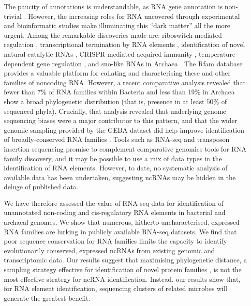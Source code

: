 \documentclass[10pt]{article}
\begin{document}
The paucity of annotations is understandable, as RNA gene annotation
is non-trivial \cite{Freyhult:2007,Nawrocki:2009}. However, the
increasing roles for RNA uncovered through experimental and
bioinformatic studies make illuminating this ``dark matter'' all the more
urgent. Among the remarkable discoveries made are: riboswitch-mediated
regulation \cite{Barrick:2007,Breaker:2012}, transcriptional
termination by RNA elements
\cite{von_Hippel:1998,Gardner:2011,Santangelo:2011}, identification of
novel natural catalytic RNAs
\cite{Kruger:1982,Guerrier-Takada:1983,Winkler:2004,Roth:2014},
CRISPR-mediated acquired immunity \cite{Barrangou:2007,Brouns:2008},
temperature-dependent gene regulation \cite{Narberhaus:2006,Loh:2013},
and sno-like RNAs in Archaea
\cite{Omer:2000,Gaspin:2000,Gardner:2010}. The Rfam database
\cite{Gardner:2011,Burge:2013} provides a valuable platform for
collating and characterising these and other families of noncoding
RNA. However, a recent comparative analysis \cite{Hoeppner:2012}
revealed that fewer than 7\% of RNA families within Bacteria and less
than 19\% in Archaea show a broad phylogenetic distribution (that is,
presence in at least 50\% of sequenced phyla). Crucially, that
analysis revealed that underlying genome sequencing biases were a
major contributor to this pattern, and that the wider genomic sampling
provided by the GEBA dataset \cite{Wu:2009} did help improve
identification of broadly-conserved RNA families
\cite{Hoeppner:2012}. Tools such as RNA-seq \cite{Croucher:2010} and
transposon insertion sequencing
\cite{van_Opijnen:2013,Barquist:2013,Barquist:2013a} promise to
complement comparative genomics tools for RNA family discovery, and it
may be possible to use a mix of data types in the identification of
RNA elements. However, to date, no systematic analysis of available
data has been undertaken, suggesting ncRNAs may be hidden in the
deluge of published data.

We have therefore assessed the value of RNA-seq data for
identification of unannotated non-coding and cis-regulatory RNA
elements in bacterial and archaeal genomes. We show that numerous,
hitherto uncharacterised, expressed RNA families are lurking in
publicly available RNA-seq datasets. We find that poor sequence
conservation for RNA families limits the capacity to identify
evolutionarily conserved, expressed ncRNAs from existing genomic and
transcriptomic data. Our results suggest that maximising phylogenetic
distance, a sampling strategy effective for identification of novel
protein families \cite{Wu:2009,Rinke:2013}, is not the
most effective strategy for ncRNA identification. Instead, our results
show that, for RNA element identification, sequencing clusters of
related microbes will generate the greatest benefit.
\end{document}
